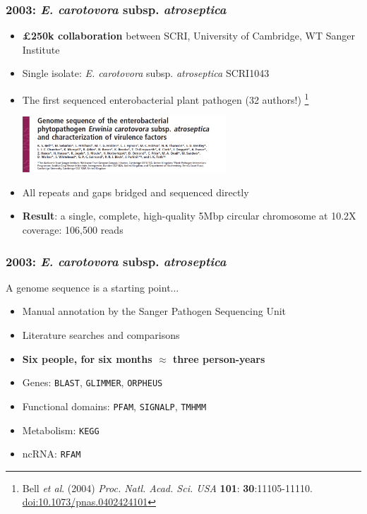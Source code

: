 \begin{frame}
  \frametitle{2003: \textit{E. carotovora} subsp. \textit{atroseptica}}
  \begin{itemize}
    \item \textbf{ \pounds250k collaboration} between SCRI, University of Cambridge, WT Sanger Institute
    \item Single isolate: \textit{E. carotovora} subsp. \textit{atroseptica} SCRI1043
    \item The first sequenced enterobacterial plant pathogen (32 authors!) \footnote{\tiny{Bell \textit{et al}. (2004) \textit{Proc. Natl. Acad. Sci. USA} \textbf{101}: \textbf{30}:11105-11110. \href{http://dx.doi.org/10.1073/pnas.0402424101}{doi:10.1073/pnas.0402424101}}}\\ 
      \begin{center}
        \includegraphics[width=0.6\textwidth]{images/pba_pnas}
      \end{center}    
    \item All repeats and gaps bridged and sequenced directly
    \item \textbf{Result}: a single, complete, high-quality 5Mbp circular chromosome at 10.2X coverage: 106,500 reads
  \end{itemize}
\end{frame}

\begin{frame}
  \frametitle{2003: \textit{E. carotovora} subsp. \textit{atroseptica}}
  A genome sequence is a starting point$\ldots$
  \begin{itemize}
    \item Manual annotation by the Sanger Pathogen Sequencing Unit
    \item Literature searches and comparisons
    \item \textbf{Six people, for six months $\approx$ three person-years}
    \item Genes: \texttt{BLAST}, \texttt{GLIMMER}, \texttt{ORPHEUS}
    \item Functional domains: \texttt{PFAM}, \texttt{SIGNALP}, \texttt{TMHMM}
    \item Metabolism: \texttt{KEGG}
    \item ncRNA: \texttt{RFAM}
  \end{itemize}
\end{frame}

